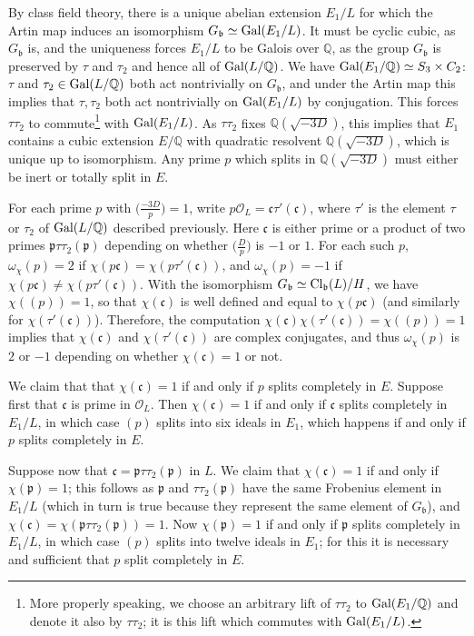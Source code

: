\documentclass[12pt]{amsart}
\theoremstyle{remark}
\numberwithin{theorem}{section} \numberwithin{equation}{section}
\newcommand{\calO}{\mathcal{O}}
\newcommand{\mfp}{\mathfrak{p}}
\newcommand{\mfb}{\mathfrak{b}}
\newcommand{\mfc}{\mathfrak{c}}
\newcommand{\Cl}{{\text {\rm Cl}}}
\newcommand{\Q}{\mathbb{Q}}
\newcommand{\Gal}{{\text {\rm Gal}}}
\begin{document}
By class field theory, there is a unique abelian extension $E_1/L$ for which the Artin map induces an isomorphism
$G_{\mfb} \simeq \Gal(E_1/L)$. It must be cyclic cubic, as $G_{\mfb}$ is, and the uniqueness forces $E_1/L$ to be 
Galois over $\Q$, as the group $G_{\mfb}$ is preserved by $\tau$ and $\tau_2$ and hence all of $\Gal(L/\Q)$.
We have $\Gal(E_1/\Q) \simeq S_3 \times C_2$: $\tau$ and $\tau_2 \in \Gal(L/\Q)$ both act nontrivially on $G_{\mfb}$,
and under the Artin map this implies that $\tau, \tau_2$ both act  nontrivially on $\Gal(E_1/L)$ by conjugation. This forces
$\tau \tau_2$ 
to commute\footnote{More properly speaking, we choose an arbitrary lift of $\tau \tau_2$ to $\Gal(E_1/\Q)$ and denote it also by
$\tau \tau_2$; it is this lift which commutes with $\Gal(E_1/L)$.}
with $\Gal(E_1/L)$. As $\tau \tau_2$ fixes $\Q(\sqrt{-3D})$, this implies that $E_1$ contains
a cubic extension $E/\Q$ with quadratic
resolvent $\Q(\sqrt{-3D})$, which is unique up to isomorphism. Any prime $p$
which splits in $\Q(\sqrt{-3D})$ must either be inert or totally split in $E$.

For each prime $p$ with $\big( \frac{-3D}{p} \big) = 1$, write $p \calO_L = \mfc \tau'(\mfc)$, where $\tau'$ is the element
$\tau$ or $\tau_2$ of $\Gal(L/\Q)$ described previously. Here $\mfc$ is either prime or a product of two primes $\mfp \tau \tau_2(\mfp)$ 
depending on whether
$\big( \frac{D}{p} \big)$ is $-1$ or $1$.
For each such $p$,
$\omega_{\chi}(p) = 2$ if $\chi(p \mfc) = \chi(p \tau'(\mfc))$, and $\omega_{\chi}(p) = -1$ if  $\chi(p \mfc) \neq \chi(p \tau'(\mfc))$.
With the isomorphism $G_{\mfb} \simeq \Cl_{\mfb}(L)/H$, we have $\chi((p)) = 1$, so that $\chi(\mfc)$ is well defined
and equal to $\chi(p \mfc)$ (and similarly for $\chi(\tau'(\mfc))$).
Therefore, the computation
$\chi(\mfc) \chi(\tau'(\mfc)) = \chi((p)) = 1$ implies
that $\chi(\mfc)$ and $\chi(\tau'(\mfc))$ are complex conjugates, and thus
$\omega_{\chi}(p)$ is $2$ or $-1$ depending on whether $\chi(\mfc) = 1$ or not.

We claim that that $\chi(\mfc) = 1$ if and only if $p$ splits completely in $E$. Suppose first that
$\mfc$ is prime in $\calO_L$. Then $\chi(\mfc) = 1$ if and only if $\mfc$ splits completely in
$E_1/L$, in which case $(p)$ splits into six ideals in $E_1$, which happens
if and only if $p$ splits completely
in $E$.

Suppose now that $\mfc = \mfp \tau \tau_2(\mfp)$ in $L$. We claim that $\chi(\mfc) = 1$ if and only if
$\chi(\mfp) = 1$; this follows 
as $\mfp$ and $\tau \tau_2(\mfp)$ have the same Frobenius element in $E_1/L$ (which in turn is true because
they represent the same element of $G_{\mfb}$), and $\chi(\mfc) = \chi(\mfp \tau \tau_2(\mfp)) = 1$.
Now $\chi(\mfp) = 1$ if and only if $\mfp$ splits completely in $E_1/L$, in which case $(p)$ splits into twelve ideals
in $E_1$; for this it is necessary and sufficient that $p$ split completely in $E$.
\end{document}
